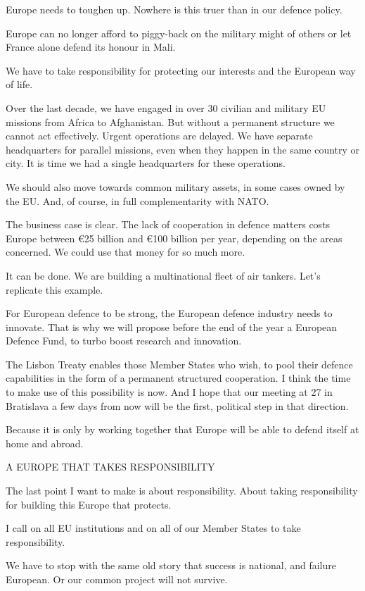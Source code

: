\documentclass[a4paper,11pt]{article}
\begin{document}
Europe needs to toughen up. Nowhere is this truer than in our defence policy.

Europe can no longer afford to piggy-back on the military might of others or let France alone defend its honour in Mali.

We have to take responsibility for protecting our interests and the European way of life.

Over the last decade, we have engaged in over 30 civilian and military EU missions from Africa to Afghanistan. But without a permanent structure we cannot act effectively. Urgent operations are delayed. We have separate headquarters for parallel missions, even when they happen in the same country or city. It is time we had a single headquarters for these operations.

We should also move towards common military assets, in some cases owned by the EU. And, of course, in full complementarity with NATO.

The business case is clear. The lack of cooperation in defence matters costs Europe between \euro25 billion and \euro100 billion per year, depending on the areas concerned. We could use that money for so much more.

It can be done. We are building a multinational fleet of air tankers. Let's replicate this example.

For European defence to be strong, the European defence industry needs to innovate. That is why we will propose before the end of the year a European Defence Fund, to turbo boost research and innovation.

The Lisbon Treaty enables those Member States who wish, to pool their defence capabilities in the form of a permanent structured cooperation. I think the time to make use of this possibility is now. And I hope that our meeting at 27 in Bratislava a few days from now will be the first, political step in that direction.

Because it is only by working together that Europe will be able to defend itself at home and abroad.

 

A EUROPE THAT TAKES RESPONSIBILITY

The last point I want to make is about responsibility. About taking responsibility for building this Europe that protects.

I call on all EU institutions and on all of our Member States to take responsibility.

We have to stop with the same old story that success is national, and failure European. Or our common project will not survive.
\end{document}
